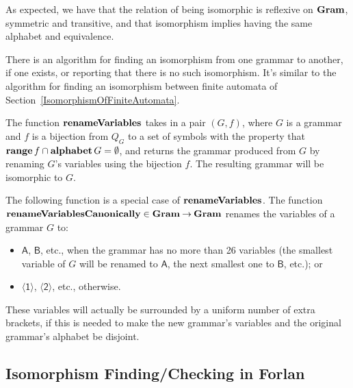 As expected, we have that the relation of being isomorphic is
reflexive on $\mathbf{Gram}$, symmetric and transitive, and that isomorphism
implies having the same alphabet and equivalence.

There is an algorithm for finding an isomorphism from one grammar to
another, if one exists, or reporting that there is no such
isomorphism.  It's similar to the algorithm for finding an isomorphism
between finite automata of Section~\ref{IsomorphismOfFiniteAutomata}.

%
The function $\mathbf{renameVariables}$ takes in a pair $(G,f)$, where $G$ is
a grammar and $f$ is a bijection from $Q_G$ to a set of symbols with
the property that $\mathbf{range}\,f\cap\mathbf{alphabet}\,G=\emptyset$, and returns
the grammar produced from $G$ by renaming $G$'s variables using the
bijection $f$.  The resulting grammar will be isomorphic to $G$.

The following function is a special case of $\mathbf{renameVariables}$.
The function $\mathbf{renameVariablesCanonically}\in\mathbf{Gram}\mathbin{\to}\mathbf{Gram}$ renames the
%
variables of a grammar $G$ to:
\begin{itemize}
\item $\mathsf{A}$, $\mathsf{B}$, etc., when the grammar has no more
  than 26 variables (the smallest variable of $G$ will be renamed to
  $\mathsf{A}$, the next smallest one to $\mathsf{B}$, etc.); or

\item $\mathsf{\langle 1\rangle}$, $\mathsf{\langle 2\rangle}$, etc.,
  otherwise.
\end{itemize}
These variables will actually be surrounded by a uniform number of
extra brackets, if this is needed to make the new grammar's variables
and the original grammar's alphabet be disjoint.

\subsection{Isomorphism Finding/Checking in Forlan}

